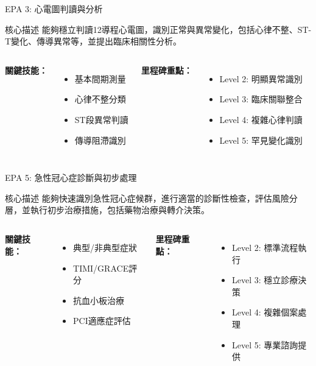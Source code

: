 \documentclass[aspectratio=169]{beamer}
\begin{document}
\begin{frame}{EPA 3: 心電圖判讀與分析}
\begin{alertblock}{核心描述}
能夠穩立判讀12導程心電圖，識別正常與異常變化，包括心律不整、ST-T變化、傳導異常等，並提出臨床相關性分析。
\end{alertblock}

\begin{columns}[c]
\textbf{關鍵技能：}
\begin{itemize}
\item 基本間期測量
\item 心律不整分類
\item ST段異常判讀
\item 傳導阻滯識別
\end{itemize}

\textbf{里程碑重點：}
\begin{itemize}
\item Level 2: 明顯異常識別
\item Level 3: 臨床關聯整合
\item Level 4: 複雜心律判讀
\item Level 5: 罕見變化識別
\end{itemize}
\end{columns}
\end{frame}

\begin{frame}{EPA 5: 急性冠心症診斷與初步處理}
\begin{alertblock}{核心描述}
能夠快速識別急性冠心症候群，進行適當的診斷性檢查，評估風險分層，並執行初步治療措施，包括藥物治療與轉介決策。
\end{alertblock}

\begin{columns}[c]
\textbf{關鍵技能：}
\begin{itemize}
\item 典型/非典型症狀
\item TIMI/GRACE評分
\item 抗血小板治療
\item PCI適應症評估
\end{itemize}

\textbf{里程碑重點：}
\begin{itemize}
\item Level 2: 標準流程執行
\item Level 3: 穩立診療決策
\item Level 4: 複雜個案處理
\item Level 5: 專業諮詢提供
\end{itemize}
\end{columns}
\end{frame}
\end{document}
